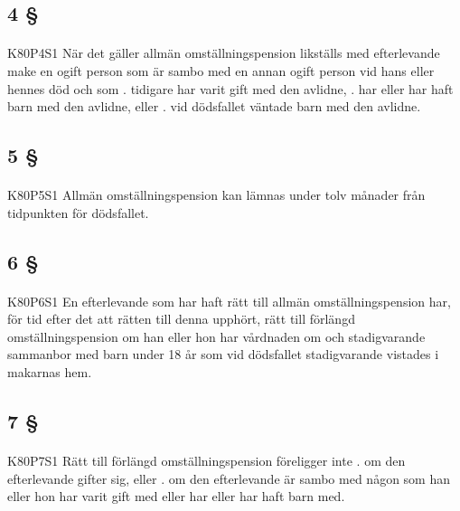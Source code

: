 \documentclass[a4paper,notitlepage,openany,10pt]{book}
\begin{document}
\subsection*{4 §}
\paragraph*{}
{\tiny K80P4S1}
När det gäller allmän omställningspension likställs med efterlevande make en ogift person som är sambo med en annan ogift person vid hans eller hennes död och som
. tidigare har varit gift med den avlidne,
. har eller har haft barn med den avlidne, eller
. vid dödsfallet väntade barn med den avlidne.
\subsection*{5 §}
\paragraph*{}
{\tiny K80P5S1}
Allmän omställningspension kan lämnas under tolv månader från tidpunkten för dödsfallet.
\subsection*{6 §}
\paragraph*{}
{\tiny K80P6S1}
En efterlevande som har haft rätt till allmän omställningspension har, för tid efter det att rätten till denna upphört, rätt till förlängd omställningspension om han eller hon har vårdnaden om och stadigvarande sammanbor med barn under 18 år som vid dödsfallet stadigvarande vistades i makarnas hem.
\subsection*{7 §}
\paragraph*{}
{\tiny K80P7S1}
Rätt till förlängd omställningspension föreligger inte
. om den efterlevande gifter sig, eller
. om den efterlevande är sambo med någon som han eller hon har varit gift med eller har eller har haft barn med.
\end{document}
